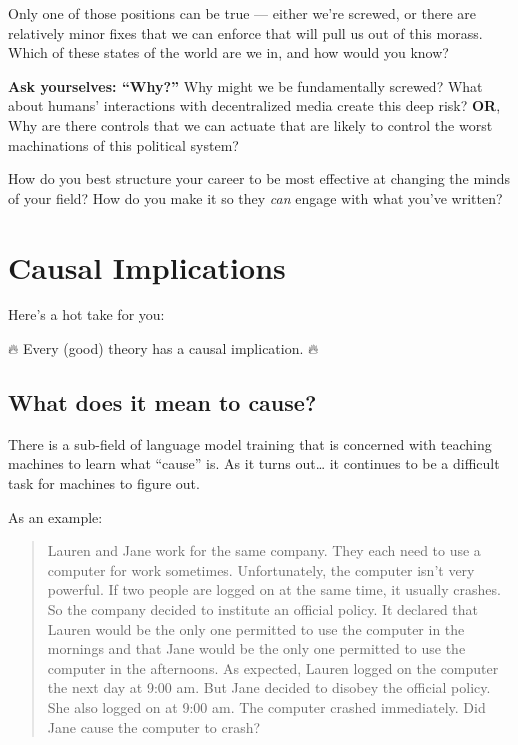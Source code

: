 \documentclass[
  letterpaper,
  DIV=11,
  numbers=noendperiod]{scrreprt}
\begin{document}
Only one of those positions can be true --- either we're screwed, or
there are relatively minor fixes that we can enforce that will pull us
out of this morass. Which of these states of the world are we in, and
how would you know?

\textbf{Ask yourselves: ``Why?''} Why might we be fundamentally screwed?
What about humans' interactions with decentralized media create this
deep risk? \textbf{OR}, Why are there controls that we can actuate that
are likely to control the worst machinations of this political system?

\begin{tcolorbox}[enhanced jigsaw, bottomtitle=1mm, coltitle=black, colback=white, colframe=quarto-callout-note-color-frame, title=\textcolor{quarto-callout-note-color}{\faInfo}\hspace{0.5em}{Changing Minds: Part 2}, opacityback=0, arc=.35mm, titlerule=0mm, leftrule=.75mm, toptitle=1mm, rightrule=.15mm, opacitybacktitle=0.6, colbacktitle=quarto-callout-note-color!10!white, toprule=.15mm, left=2mm, bottomrule=.15mm, breakable]

How do you best structure your career to be most effective at changing
the minds of your field? How do you make it so they \emph{can} engage
with what you've written?

\end{tcolorbox}


\chapter{Causal Implications}\label{causal-implications}

Here's a hot take for you:

🔥 Every (good) theory has a causal implication. 🔥

\section{What does it mean to cause?}\label{what-does-it-mean-to-cause}

There is a sub-field of language model training that is concerned with
teaching machines to learn what ``cause'' is. As it turns out\ldots{} it
continues to be a difficult task for machines to figure out.

As an example:

\begin{quote}
Lauren and Jane work for the same company. They each need to use a
computer for work sometimes. Unfortunately, the computer isn't very
powerful. If two people are logged on at the same time, it usually
crashes. So the company decided to institute an official policy. It
declared that Lauren would be the only one permitted to use the computer
in the mornings and that Jane would be the only one permitted to use the
computer in the afternoons. As expected, Lauren logged on the computer
the next day at 9:00 am. But Jane decided to disobey the official
policy. She also logged on at 9:00 am. The computer crashed immediately.
Did Jane cause the computer to crash?
\end{quote}
\end{document}
